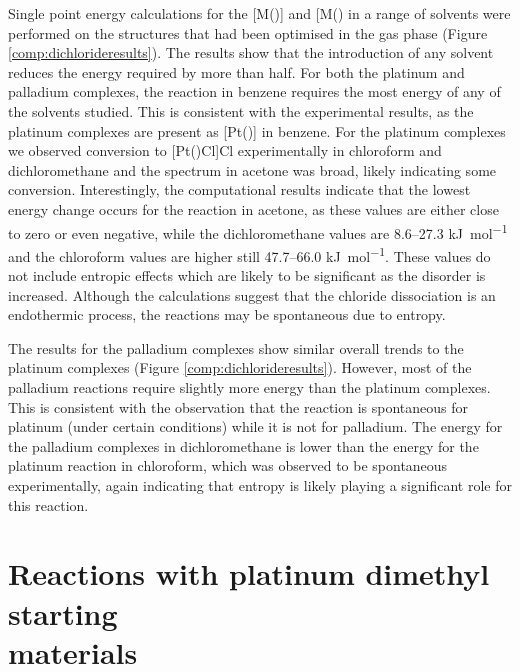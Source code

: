 Single point energy calculations for the [M(\tBuxantphos)] and [M(\tBuxantphosk)\ce{Cl]^{+}} in a range of solvents were performed on the structures that had been optimised in the gas phase (Figure \ref{comp:dichlorideresults}).  The results show that the introduction of any solvent reduces the energy required by more than half.  For both the platinum and palladium complexes, the reaction in benzene requires the most energy of any of the solvents studied.  This is consistent with the experimental results, as the platinum complexes are present as [Pt(\tBuxantphos)] in benzene.  For the platinum complexes we observed conversion to [Pt(\tBuxantphosk)Cl]Cl experimentally in chloroform and dichloromethane and the spectrum in acetone was broad, likely indicating some conversion.  Interestingly, the computational results indicate that the lowest energy change occurs for the reaction in acetone, as these values are either close to zero or even negative, while the dichloromethane values are 8.6--27.3 \si{\kilo\joule\per\mole} and the chloroform values are higher still 47.7--66.0 \si{\kilo\joule\per\mole}.  These values do not include entropic effects which are likely to be significant as the disorder is increased.  Although the calculations suggest that the chloride dissociation is an endothermic process, the reactions may be spontaneous due to entropy.  

The results for the palladium complexes show similar overall trends to the platinum complexes (Figure \ref{comp:dichlorideresults}).  However, most of the palladium reactions require slightly more energy than the platinum complexes.  This is consistent with the observation that the reaction is spontaneous for platinum (under certain conditions) while it is not for palladium.  The energy for the palladium complexes in dichloromethane is lower than the energy for the platinum reaction in chloroform, which was observed to be spontaneous experimentally, again indicating that entropy is likely playing a significant role for this reaction.   


\section{Reactions with platinum dimethyl starting\\materials}

